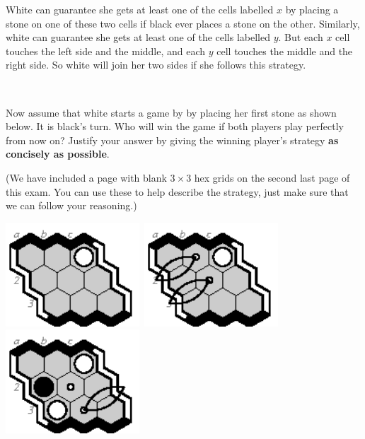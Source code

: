 \documentclass[12pt]{article}
\begin{document}
White can guarantee she gets at least one of the cells labelled $x$ 
by placing a stone on one of these two cells
if black ever places a stone on the other. 
Similarly, white can guarantee she gets at least one of the cells 
labelled $y$.
But each $x$ cell touches the left side and the middle,
and each $y$ cell touches the middle and the right side.
So white will join her two sides if she follows this strategy.

~

Now assume that white starts a game by
by placing her first stone as shown below. 
It is black's turn. 
Who will win the game if both players play perfectly from now on?
Justify your answer by giving the winning player's strategy 
{\bf as concisely as possible}. 

(We have included a page with blank $3 \times 3$ hex grids
on the second last page of this exam. You can use these to help describe the strategy, just make sure that we can follow your reasoning.)

\vfill

\noindent
\hfill\includegraphics[width=50mm]{fz/pix/3strat.eps}\
\hfill\includegraphics[width=50mm]{fz/pix/3strat0.eps}\
\hfill\includegraphics[width=50mm]{fz/pix/3strat1.eps}

\vfill

\end{document}

